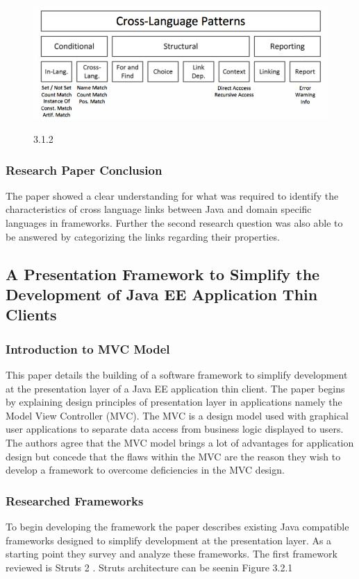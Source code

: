 			\begin{figure}[!htb]
				\includegraphics[width=.8\textwidth]{img2.png}
				\begin{center}
					\figurename{ 3.1.2}
					\end{center}
					\end{figure}
					
					\subsubsection{Research Paper Conclusion}
					The paper showed a clear understanding for what was required to identify the characteristics of cross language links between Java and domain specific languages in frameworks. Further the second research question was also able to be answered by categorizing the links regarding their properties. 
					
					\subsection{A Presentation Framework to Simplify the Development of Java EE Application Thin Clients}
					
					\subsubsection{Introduction to MVC Model}
					This paper details the building of a software framework to simplify development at the presentation layer of a Java EE application thin client. The paper begins by explaining design principles of presentation layer in applications namely the Model View Controller (MVC). The MVC is a design model used with graphical user applications to separate data access from business logic displayed to users. The authors agree that the MVC model brings a lot of advantages for application design but concede that the flaws within the MVC are the reason they wish to develop a framework to overcome deficiencies in the MVC design.
					
					\subsubsection{Researched Frameworks}
					To begin developing the framework the paper describes existing Java compatible frameworks designed to simplify development at the presentation layer. As a starting point they survey and analyze these frameworks. The first framework reviewed is Struts 2 \cite{struts}. Struts architecture can be seenin Figure 3.2.1 
					
